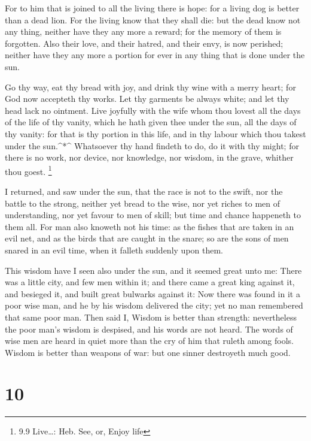  For to him that is joined to all the living there is hope:
for a living dog is better than a dead lion.  For the living
know that they shall die: but the dead know not any thing, neither have
they any more a reward; for the memory of them is forgotten.
 Also their love, and their hatred, and their envy, is now
perished; neither have they any more a portion for ever in any thing
that is done under the sun.

 Go thy way, eat thy bread with joy, and drink thy wine with
a merry heart; for God now accepteth thy works.  Let thy
garments be always white; and let thy head lack no ointment.
 Live joyfully with the wife whom thou lovest all the days
of the life of thy vanity, which he hath given thee under the sun, all
the days of thy vanity: for that is thy portion in this life, and in thy
labour which thou takest under the sun.\^{}*\^{} 
Whatsoever thy hand findeth to do, do it with thy might; for there is no
work, nor device, nor knowledge, nor wisdom, in the grave, whither thou
goest. \footnote{9.9 Live\ldots: Heb. See, or, Enjoy life}

 I returned, and saw under the sun, that the race is not to
the swift, nor the battle to the strong, neither yet bread to the wise,
nor yet riches to men of understanding, nor yet favour to men of skill;
but time and chance happeneth to them all.  For man also
knoweth not his time: as the fishes that are taken in an evil net, and
as the birds that are caught in the snare; so are the sons of men snared
in an evil time, when it falleth suddenly upon them.

 This wisdom have I seen also under the sun, and it seemed
great unto me:  There was a little city, and few men within
it; and there came a great king against it, and besieged it, and built
great bulwarks against it:  Now there was found in it a
poor wise man, and he by his wisdom delivered the city; yet no man
remembered that same poor man.  Then said I, Wisdom is
better than strength: nevertheless the poor man's wisdom is despised,
and his words are not heard.  The words of wise men are
heard in quiet more than the cry of him that ruleth among fools.
 Wisdom is better than weapons of war: but one sinner
destroyeth much good.

\hypertarget{section-9}{%
\section{10}\label{section-9}}

